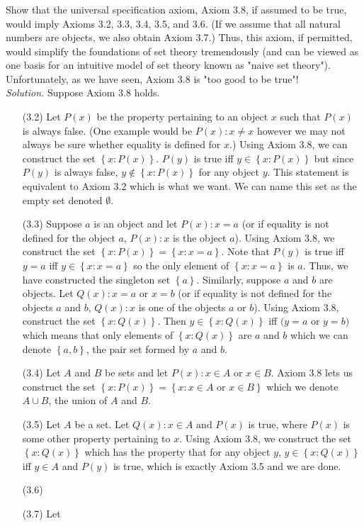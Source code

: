 \documentclass{amsart}
\theoremstyle{definition}
\newcommand{\soln}{\newline\textit{Solution.} }
\newcommand{\set}[1]{\left\{#1\right\}}
\begin{document}
\subsubsection{} Show that the universal specification axiom, Axiom 3.8, if assumed to be true, would imply Axioms 3.2, 3.3, 3.4, 3.5, and 3.6. (If we assume that all natural numbers are objects, we also obtain Axiom 3.7.) Thus, this axiom, if permitted, would simplify the foundations of set theory tremendously (and can be viewed as one basis for an intuitive model of set theory known as "naive set theory"). Unfortunately, as we have seen, Axiom 3.8 is "too good to be true"! \\
\soln Suppose Axiom 3.8 holds. 
\begin{enumerate}
    \item[(3.2)] Let $P(x)$ be the property pertaining to an object $x$ such that $P(x)$ is always false. (One example would be $P(x): x\neq x$ however we may not always be sure whether equality is defined for $x$.) Using Axiom 3.8, we can construct the set $\set{x: P(x)}$. $P(y)$ is true iff $y\in\set{x:P(x)}$ but since $P(y)$ is always false, $y\notin\set{x:P(x)}$ for any object $y$. This statement is equivalent to Axiom 3.2 which is what we want. We can name this set as the empty set denoted $\emptyset$. \\
    \item[(3.3)] Suppose $a$ is an object and let $P(x): x=a$ (or if equality is not defined for the object $a$, $P(x): x$ is the object $a$). Using Axiom 3.8, we construct the set $\set{x: P(x)}=\set{x:x=a}$. Note that $P(y)$ is true iff $y=a$ iff $y\in\set{x:x=a}$ so the only element of $\set{x:x=a}$ is $a$. Thus, we have constructed the singleton set $\set{a}$. Similarly, suppose $a$ and $b$ are objects. Let $Q(x): x=a \text{ or } x=b$ (or if equality is not defined for the objects $a$ and $b$, $Q(x): x$ is one of the objects $a$ or $b$). Using Axiom 3.8, construct the set $\set{x:Q(x)}$. Then $y\in\set{x:Q(x)}$ iff $(y=a$ or $y=b)$ which means that only elements of $\set{x:Q(x)}$ are $a$ and $b$ which we can denote $\set{a,b}$, the pair set formed by $a$ and $b$.\\
    \item[(3.4)] Let $A$ and $B$ be sets and let $P(x):x\in A \text{ or } x\in B$. Axiom 3.8 lets us construct the set $\set{x:P(x)}=\set{x:x\in A \text{ or } x\in B}$ which we denote $A\cup B$, the union of $A$ and $B$. \\
    \item[(3.5)] Let $A$ be a set. Let $Q(x):x\in A \text{ and } P(x)$ is true, where $P(x)$ is some other property pertaining to $x$. Using Axiom 3.8, we construct the set $\set{x:Q(x)}$ which has the property that for any object $y$, $y\in \set{x:Q(x)}$ iff $y\in A$ and $P(y)$ is true, which is exactly Axiom 3.5 and we are done. \\
    \item[(3.6)] 
    \item[(3.7)] Let \\
\end{enumerate}
\end{document}
